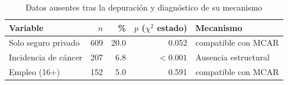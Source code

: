\begin{table}[htbp]
\centering
\small
\caption{Datos ausentes tras la depuración y diagnóstico de su mecanismo}\label{tab:ausentes}
\begin{tabularx}{\linewidth}{>{\raggedright\arraybackslash}X r r r l}
\toprule
Variable & $n$ & \% & $p$ ($\chi^2$ estado) & Mecanismo \\
\midrule
Solo seguro privado & \num{609} & \num{20.0} & \num{0.052} & compatible con MCAR \\
Incidencia de cáncer & \num{207} & \num{6.8} & $<\num{0.001}$ & Ausencia estructural \\
Empleo (16+) & \num{152} & \num{5.0} & \num{0.591} & compatible con MCAR \\
\bottomrule
\end{tabularx}
\par{}
\end{table}
